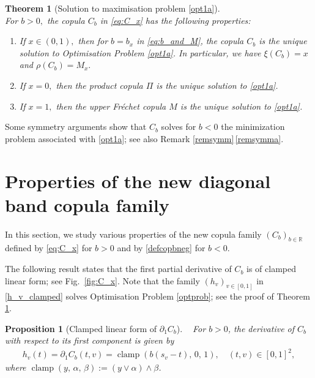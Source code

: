 \documentclass{article}
\theoremstyle{plain}
\newtheorem{theorem}{Theorem}
\newtheorem{proposition}{Proposition}
\theoremstyle{definition}
\newcommand{\R}{\mathbb{R}}
\begin{document}
\begin{theorem}[Solution to maximisation problem \eqref{opt1a}]\label{thexirhooptimisation}~\\
For \(b>0,\) the copula \(C_b\) in \eqref{eq:C_x} has the following properties:
\begin{enumerate}[label=(\roman*), font=\upshape]
    \item If \(x\in (0,1),\) then for \(b = b_x\) in \eqref{eq:b_and_M}, the copula \(C_b\) is the unique solution to Optimisation Problem \eqref{opt1a}. In particular, we have \(\xi(C_{b}) = x\) and \(\rho(C_{b}) = M_x.\)
    \item \label{thexirhooptimisation2} If \(x = 0,\) then the product copula \(\Pi\) is the unique solution to \eqref{opt1a}.
    \item \label{thexirhooptimisation3} If \(x=1,\) then the upper Fr\'{e}chet copula \(M\) is the unique solution to \eqref{opt1a}.
\end{enumerate}
\end{theorem}

Some symmetry arguments show that \(C_b\) solves for \(b<0\) the minimization problem associated with \eqref{opt1a}; see also Remark \ref{remsymm}\,\ref{remsymma}.



\section{Properties of the new diagonal band copula family}\label{sec4}

In this section, we study various properties of the new copula family \((C_b)_{b\in \R}\) defined by \eqref{eq:C_x} for \(b>0\) and by \eqref{defcopbneg} for \(b<0\).

The following result states that the first partial derivative of \(C_b\) is of clamped linear form; see Fig.~\ref{fig:C_x}. Note that
the family \((h_v)_{v\in [0,1]}\) in \eqref{h_v_clamped} solves Optimisation Problem \ref{optprob}; see the proof of Theorem \ref{thexirhooptimisation}.


\begin{proposition}[Clamped linear form of \(\partial_1 C_b\)]\label{remcopfam}~
    For \(b>0\), the derivative of \(C_b\) with respect to its first component is given by
\begin{align}\label{h_v_clamped}
   h_v(t)=\partial_1 C_b(t,v) = \operatorname{clamp}\left(b(s_v-t),\,0,\,1\right), \quad (t,v)\in [0,1]^2,
\end{align}  
where \(\operatorname{clamp}(y,\,\alpha,\,\beta) := (y \vee \alpha) \wedge \beta\).
\end{proposition}
\end{document}
